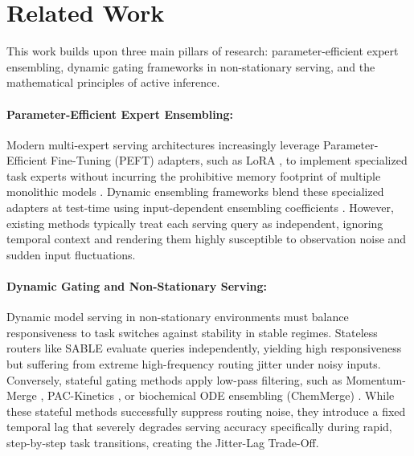 \section{Related Work}
\label{sec:related_work}

This work builds upon three main pillars of research: parameter-efficient expert ensembling, dynamic gating frameworks in non-stationary serving, and the mathematical principles of active inference.

\paragraph{Parameter-Efficient Expert Ensembling:}
Modern multi-expert serving architectures increasingly leverage Parameter-Efficient Fine-Tuning (PEFT) adapters, such as LoRA \cite{lora2021}, to implement specialized task experts without incurring the prohibitive memory footprint of multiple monolithic models \cite{moe2017}. Dynamic ensembling frameworks blend these specialized adapters at test-time using input-dependent ensembling coefficients \cite{lorahub2023, s-lora2024}. However, existing methods typically treat each serving query as independent, ignoring temporal context and rendering them highly susceptible to observation noise and sudden input fluctuations.

\paragraph{Dynamic Gating and Non-Stationary Serving:}
Dynamic model serving in non-stationary environments must balance responsiveness to task switches against stability in stable regimes. Stateless routers like SABLE \cite{sable2024} evaluate queries independently, yielding high responsiveness but suffering from extreme high-frequency routing jitter under noisy inputs. Conversely, stateful gating methods apply low-pass filtering, such as Momentum-Merge \cite{momentummerge2025}, PAC-Kinetics \cite{packinetics2025}, or biochemical ODE ensembling (ChemMerge) \cite{chemmerge2025}. While these stateful methods successfully suppress routing noise, they introduce a fixed temporal lag that severely degrades serving accuracy specifically during rapid, step-by-step task transitions, creating the Jitter-Lag Trade-Off.

